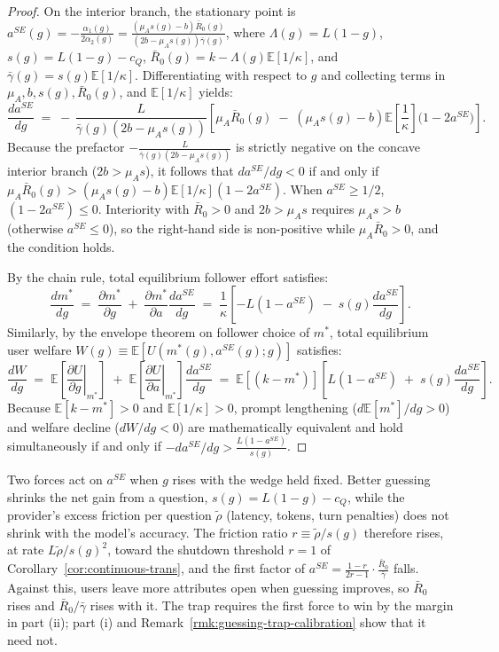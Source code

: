 \documentclass[11pt]{article}
\begin{document}
\begin{proof}
On the interior branch, the stationary point is $a^{SE}(g) = -\frac{\alpha_1(g)}{2\alpha_2(g)} = \frac{(\mu_A s(g) - b)\bar R_0(g)}{(2b - \mu_A s(g))\bar\gamma(g)}$, where $\Lambda(g) = L(1-g)$, $s(g) = L(1-g) - c_Q$, $\bar R_0(g) = k - \Lambda(g)\mathbb{E}[1/\kappa]$, and $\bar\gamma(g) = s(g)\mathbb{E}[1/\kappa]$.
Differentiating with respect to $g$ and collecting terms in $\mu_A, b, s(g), \bar R_0(g)$, and $\mathbb{E}[1/\kappa]$ yields:
\[
\frac{da^{SE}}{dg} \;=\; -\,\frac{L}{\bar\gamma(g)(2b - \mu_A s(g))}\left[ \mu_A \bar R_0(g) \;-\; (\mu_A s(g) - b)\mathbb{E}\left[\frac{1}{\kappa}\right]\big(1 - 2a^{SE}\big) \right].
\]
Because the prefactor $-\frac{L}{\bar\gamma(g)(2b - \mu_A s(g))}$ is strictly negative on the concave interior branch ($2b > \mu_A s$), it follows that $da^{SE}/dg < 0$ if and only if $\mu_A \bar R_0(g) > (\mu_A s(g) - b)\mathbb{E}[1/\kappa](1 - 2a^{SE})$.
When $a^{SE} \ge 1/2$, $(1 - 2a^{SE}) \le 0$. Interiority with $\bar R_0 > 0$ and $2b > \mu_A s$ requires $\mu_A s > b$ (otherwise $a^{SE} \le 0$), so the right-hand side is non-positive while $\mu_A \bar R_0 > 0$, and the condition holds.

By the chain rule, total equilibrium follower effort satisfies:
\[
\frac{dm^*}{dg} \;=\; \frac{\partial m^*}{\partial g} \;+\; \frac{\partial m^*}{\partial a}\frac{da^{SE}}{dg} \;=\; \frac{1}{\kappa}\left[ -L(1 - a^{SE}) \;-\; s(g)\frac{da^{SE}}{dg} \right].
\]
Similarly, by the envelope theorem on follower choice of $m^*$, total equilibrium user welfare $W(g) \equiv \mathbb{E}[U(m^*(g), a^{SE}(g); g)]$ satisfies:
\[
\frac{dW}{dg} \;=\; \mathbb{E}\left[ \left.\frac{\partial U}{\partial g}\right|_{m^*} \right] \;+\; \mathbb{E}\left[ \left.\frac{\partial U}{\partial a}\right|_{m^*} \right]\frac{da^{SE}}{dg} \;=\; \mathbb{E}[(k - m^*)]\left[ L(1 - a^{SE}) \;+\; s(g)\frac{da^{SE}}{dg} \right].
\]
Because $\mathbb{E}[k - m^*] > 0$ and $\mathbb{E}[1/\kappa] > 0$, prompt lengthening ($d\mathbb{E}[m^*]/dg > 0$) and welfare decline ($dW/dg < 0$) are mathematically equivalent and hold simultaneously if and only if $-da^{SE}/dg > \frac{L(1 - a^{SE})}{s(g)}$.
\end{proof}

Two forces act on $a^{SE}$ when $g$ rises with the wedge held fixed. Better guessing shrinks the net gain from a question, $s(g) = L(1-g) - c_Q$, while the provider's excess friction per question $\tilde\rho$ (latency, tokens, turn penalties) does not shrink with the model's accuracy. The friction ratio $r \equiv \tilde\rho/s(g)$ therefore rises, at rate $L\tilde\rho/s(g)^2$, toward the shutdown threshold $r = 1$ of Corollary~\ref{cor:continuous-trans}, and the first factor of $a^{SE} = \frac{1 - r}{2r - 1}\cdot\frac{\bar R_0}{\bar\gamma}$ falls. Against this, users leave more attributes open when guessing improves, so $\bar R_0$ rises and $\bar R_0/\bar\gamma$ rises with it. The trap requires the first force to win by the margin in part (ii); part (i) and Remark~\ref{rmk:guessing-trap-calibration} show that it need not.
\end{document}
